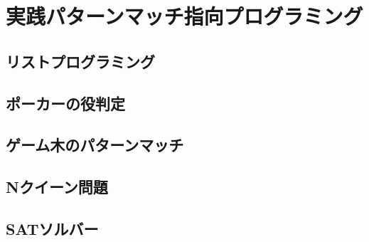\chapter{実践パターンマッチ指向プログラミング}\label{pmo-challange}

\section{リストプログラミング}

\section{ポーカーの役判定}

\section{ゲーム木のパターンマッチ}

\section{Nクイーン問題}

\section{SATソルバー}
